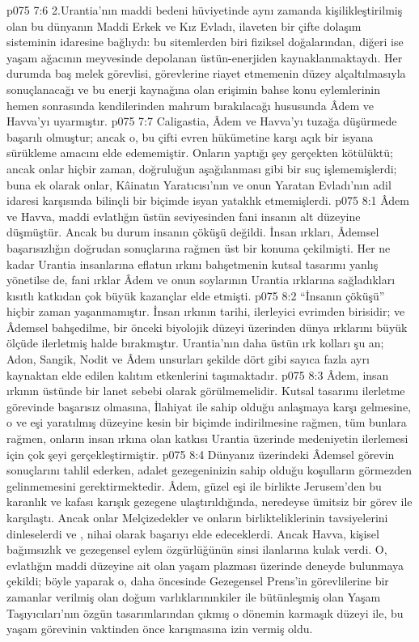 \vs p075 7:6 2.\bibnobreakspace Urantia’nın maddi bedeni hüviyetinde aynı zamanda kişilikleştirilmiş olan bu dünyanın Maddi Erkek ve Kız Evladı, ilaveten bir çifte dolaşım sisteminin idaresine bağlıydı: bu sitemlerden biri fiziksel doğalarından, diğeri ise yaşam ağacının meyvesinde depolanan üstün\hyp{}enerjiden kaynaklanmaktaydı. Her durumda baş melek görevlisi, görevlerine riayet etmemenin düzey alçaltılmasıyla sonuçlanacağı ve bu enerji kaynağına olan erişimin bahse konu eylemlerinin hemen sonrasında kendilerinden mahrum bırakılacağı hususunda Âdem ve Havva’yı uyarmıştır.
\vs p075 7:7 Caligastia, Âdem ve Havva’yı tuzağa düşürmede başarılı olmuştur; ancak o, bu çifti evren hükümetine karşı açık bir isyana sürükleme amacını elde edememiştir. Onların yaptığı şey gerçekten kötülüktü; ancak onlar hiçbir zaman, doğruluğun aşağılanması gibi bir suç işlememişlerdi; buna ek olarak onlar, Kâinatın Yaratıcısı’nın ve onun Yaratan Evladı’nın adil idaresi karşısında bilinçli bir biçimde isyan yataklık etmemişlerdi.
\vs p075 8:1 Âdem ve Havva, maddi evlatlığın üstün seviyesinden fani insanın alt düzeyine düşmüştür. Ancak bu durum insanın çöküşü değildi. İnsan ırkları, Âdemsel başarısızlığın doğrudan sonuçlarına rağmen üst bir konuma çekilmişti. Her ne kadar Urantia insanlarına eflatun ırkını bahşetmenin kutsal tasarımı yanlış yönetilse de, fani ırklar Âdem ve onun soylarının Urantia ırklarına sağladıkları kısıtlı katkıdan çok büyük kazançlar elde etmişti.
\vs p075 8:2 “İnsanın çöküşü” hiçbir zaman yaşanmamıştır. İnsan ırkının tarihi, ilerleyici evrimden birisidir; ve Âdemsel bahşedilme, bir önceki biyolojik düzeyi üzerinden dünya ırklarını büyük ölçüde ilerletmiş halde bırakmıştır. Urantia’nın daha üstün ırk kolları şu an; Adon, Sangik, Nodit ve Âdem unsurları şekilde dört gibi sayıca fazla ayrı kaynaktan elde edilen kalıtım etkenlerini taşımaktadır.
\vs p075 8:3 Âdem, insan ırkının üstünde bir lanet sebebi olarak görülmemelidir. Kutsal tasarımı ilerletme görevinde başarısız olmasına, İlahiyat ile sahip olduğu anlaşmaya karşı gelmesine, o ve eşi yaratılmış düzeyine kesin bir biçimde indirilmesine rağmen, tüm bunlara rağmen, onların insan ırkına olan katkısı Urantia üzerinde medeniyetin ilerlemesi için çok şeyi gerçekleştirmiştir.
\vs p075 8:4 Dünyanız üzerindeki Âdemsel görevin sonuçlarını tahlil ederken, adalet gezegeninizin sahip olduğu koşulların görmezden gelinmemesini gerektirmektedir. Âdem, güzel eşi ile birlikte Jerusem’den bu karanlık ve kafası karışık gezegene ulaştırıldığında, neredeyse ümitsiz bir görev ile karşılaştı. Ancak onlar Melçizedekler ve onların birlikteliklerinin tavsiyelerini dinleselerdi ve , nihai olarak başarıyı elde edeceklerdi. Ancak Havva, kişisel bağımsızlık ve gezegensel eylem özgürlüğünün sinsi ilanlarına kulak verdi. O, evlatlığın maddi düzeyine ait olan yaşam plazması üzerinde deneyde bulunmaya çekildi; böyle yaparak o, daha öncesinde Gezegensel Prens’in görevlilerine bir zamanlar verilmiş olan doğum varlıklarınınkiler ile bütünleşmiş olan Yaşam Taşıyıcıları’nın özgün tasarımlarından çıkmış o dönemin karmaşık düzeyi ile, bu yaşam görevinin vaktinden önce karışmasına izin vermiş oldu.

